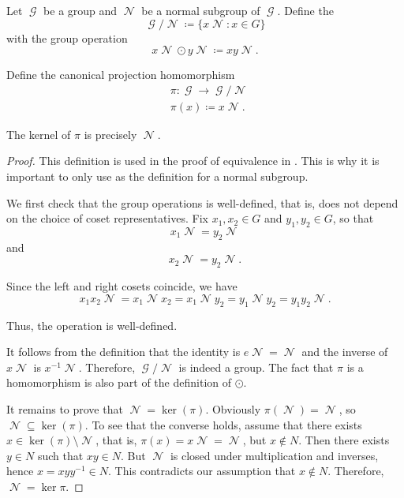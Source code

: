 \begin{definition}\label{def:quotient_group}
  Let \( \mscrG \) be a group and \( \mscrN \) be a normal subgroup of \( \mscrG \). Define the 
  \begin{equation*}
    \mscrG / \mscrN \coloneqq \{ x \mscrN \colon x \in G \}
  \end{equation*}
  with the group operation
  \begin{equation*}
    x \mscrN \odot y \mscrN \coloneqq xy \mscrN.
  \end{equation*}

  Define the canonical projection homomorphism
  \begin{align*}
    &\pi: \mscrG \to \mscrG / \mscrN \\
    &\pi(x) \coloneqq x \mscrN.
  \end{align*}

  The kernel of \( \pi \) is precisely \( \mscrN \).
\end{definition}
\begin{proof}
  This definition is used in the proof of equivalence in . This is why it is important to only use  as the definition for a normal subgroup.

  We first check that the group operations is well-defined, that is, does not depend on the choice of coset representatives. Fix \( x_1, x_2 \in G \) and \( y_1, y_2 \in G \), so that
  \begin{equation*}
    x_1 \mscrN = y_2 \mscrN
  \end{equation*}
  and
  \begin{equation*}
    x_2 \mscrN = y_2 \mscrN.
  \end{equation*}

  Since the left and right cosets coincide, we have
  \begin{equation*}
    x_1 x_2 \mscrN = x_1 \mscrN x_2 = x_1 \mscrN y_2 = y_1 \mscrN y_2 = y_1 y_2 \mscrN.
  \end{equation*}

  Thus, the operation is well-defined.

  It follows from the definition that the identity is \( e \mscrN = \mscrN \) and the inverse of \( x \mscrN \) is \( x^{-1} \mscrN \). Therefore, \( \mscrG / \mscrN \) is indeed a group. The fact that \( \pi \) is a homomorphism is also part of the definition of \( \odot \).

  It remains to prove that \( \mscrN = \ker(\pi) \). Obviously \( \pi(\mscrN) = \mscrN \), so \( \mscrN \subseteq \ker(\pi) \). To see that the converse holds, assume that there exists \( x \in \ker(\pi) \setminus \mscrN \), that is, \( \pi(x) = x\mscrN = \mscrN \), but \( x \not\in N \). Then there exists \( y \in N \) such that \( xy \in N \). But \( \mscrN \) is closed under multiplication and inverses, hence \( x = xyy^{-1} \in N \). This contradicts our assumption that \( x \not\in N \). Therefore, \( \mscrN = \ker \pi \).
\end{proof}


